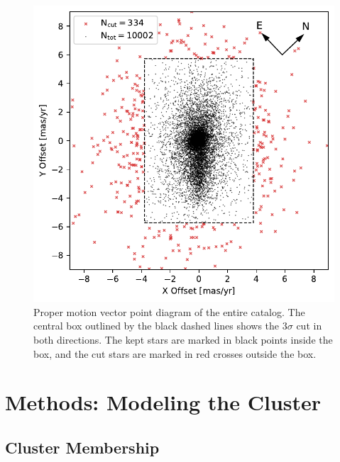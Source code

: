 \documentclass[12pt]{ucsddissertation}
\begin{document}
\begin{CJK*}{UTF8}{gbsn}
\begin{figure}[htb!]
\centering \includegraphics[width=0.7\linewidth]{figures/chapter2/WD1_Proper_Motion_Membership_no_title_w_ne.pdf}
\caption[Proper motion vector point diagram of Wd1]{Proper motion vector point diagram of the entire catalog. The central box outlined by the black dashed lines shows the $3\sigma$ cut in both directions. The kept stars are marked in black points inside the box, and the cut stars are marked in red crosses outside the box.}
\label{fig:box_cut_vpd}
\end{figure}



\section{Methods: Modeling the Cluster}
\label{wd1-sec:methods}

\subsection{Cluster Membership}
\label{wd1-subsec:cluster_membership}


\end{CJK*}
\end{document}
